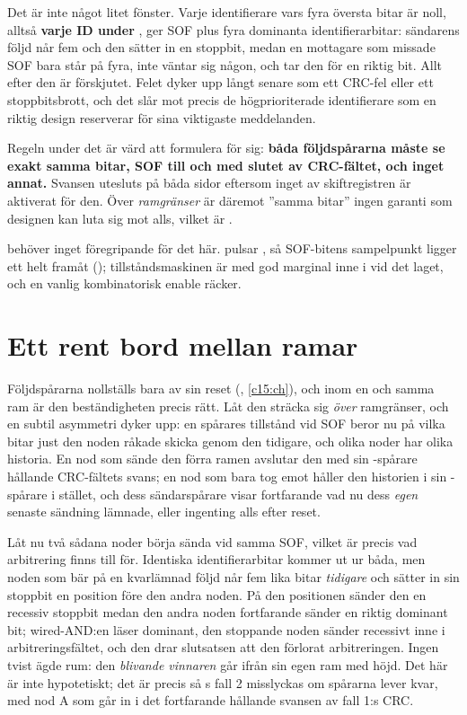 Det är inte något litet fönster. Varje identifierare vars fyra översta bitar är noll, alltså
\textbf{varje ID under }, ger SOF plus fyra dominanta identifierarbitar: sändarens följd
når fem och den sätter in en stoppbit, medan en mottagare som missade SOF bara står på fyra, inte
väntar sig någon, och tar den för en riktig bit. Allt efter den är förskjutet. Felet dyker upp långt
senare som ett CRC-fel eller ett stoppbitsbrott, och det slår mot precis de högprioriterade
identifierare som en riktig design reserverar för sina viktigaste meddelanden.

Regeln under det är värd att formulera för sig: \textbf{båda följdspårarna måste se exakt samma
bitar, SOF till och med slutet av CRC-fältet, och inget annat.} Svansen utesluts på båda sidor
eftersom inget av skiftregistren är aktiverat för den. Över \emph{ramgränser} är däremot ”samma
bitar” ingen garanti som designen kan luta sig mot alls, vilket är .

 behöver inget föregripande för det här.  pulsar ,
så SOF-bitens sampelpunkt ligger ett helt  framåt ();
tillståndsmaskinen är med god marginal inne i  vid det laget, och en vanlig
kombinatorisk enable räcker.

\section{Ett rent bord mellan ramar}
\label{c17:sec:cleanslate}

Följdspårarna nollställs bara av sin reset (, \ref{c15:ch}), och inom en och samma
ram är den beständigheten precis rätt. Låt den sträcka sig \emph{över} ramgränser, och en subtil
asymmetri dyker upp: en spårares tillstånd vid SOF beror nu på vilka bitar just den noden råkade
skicka genom den tidigare, och olika noder har olika historia. En nod som sände den förra ramen
avslutar den med sin -spårare hållande CRC-fältets svans; en nod som bara tog emot
håller den historien i sin -spårare i stället, och dess sändarspårare visar
fortfarande vad nu dess \emph{egen} senaste sändning lämnade, eller ingenting alls efter reset.

Låt nu två sådana noder börja sända vid samma SOF, vilket är precis vad arbitrering finns till för.
Identiska identifierarbitar kommer ut ur båda, men noden som bär på en kvarlämnad följd når fem lika
bitar \emph{tidigare} och sätter in sin stoppbit en position före den andra noden. På den positionen
sänder den en recessiv stoppbit medan den andra noden fortfarande sänder en riktig dominant bit;
wired-AND:en läser dominant, den stoppande noden sänder recessivt inne i arbitreringsfältet, och den
drar slutsatsen att den förlorat arbitreringen. Ingen tvist ägde rum: den \emph{blivande vinnaren}
går ifrån sin egen ram med  höjd. Det här är inte hypotetiskt; det är precis så
s fall 2 misslyckas om spårarna lever kvar, med nod A som går in i det
fortfarande hållande svansen av fall 1:s CRC.

